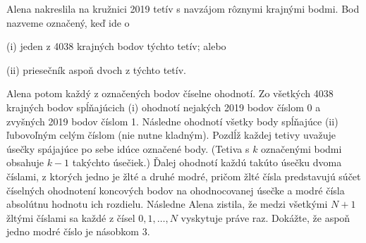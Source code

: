 {%
Alena nakreslila na kružnici 2019 tetív s navzájom rôznymi krajnými bodmi. Bod nazveme
označený, keď ide o
\item{(i)} jeden z 4038 krajných bodov týchto tetív; alebo
\item{(ii)} priesečník aspoň dvoch z týchto tetív.

Alena potom každý z označených bodov číselne ohodnotí. Zo všetkých 4038 krajných bodov spĺňajúcich (i) ohodnotí nejakých 2019 bodov číslom 0 a zvyšných 2019 bodov číslom 1. Následne ohodnotí
všetky body spĺňajúce (ii) ľubovoľným celým číslom (nie nutne kladným).
Pozdĺž každej tetivy uvažuje úsečky spájajúce po sebe idúce označené body. (Tetiva s $k$ označenými
bodmi obsahuje $k-1$ takýchto úsečiek.) Ďalej ohodnotí každú takúto úsečku dvoma číslami, z ktorých
jedno je žlté a druhé modré, pričom žlté čísla predstavujú súčet číselných ohodnotení koncových bodov
na ohodnocovanej úsečke a modré čísla absolútnu hodnotu ich rozdielu.
Následne Alena zistila, že medzi všetkými $N +1$ žltými číslami sa každé z čísel $0, 1, \ldots , N$ vyskytuje
práve raz. Dokážte, že aspoň jedno modré číslo je násobkom 3.}
